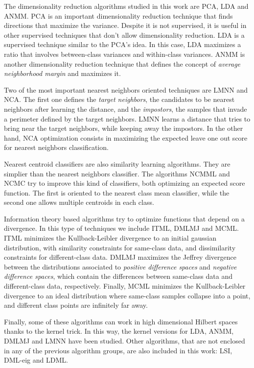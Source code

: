 The dimensionality reduction algorithms studied in this work are PCA, LDA and ANMM. PCA is an important dimensionality reduction technique that finds directions that maximize the variance. Despite it is not supervised, it is useful in other supervised techniques that don't allow dimensionality reduction. LDA is a supervised technique similar to the PCA's idea. In this case, LDA maximizes a ratio that involves between-class variances and within-class variances. ANMM is another dimensionality reduction technique that defines the concept of \emph{average neighborhood margin} and maximizes it.

Two of the most important nearest neighbors oriented techniques are LMNN and NCA. The first one defines the \emph{target neighbors}, the candidates to be nearest neighbors after learning the distance, and the \emph{impostors}, the samples that invade a perimeter defined by the target neighbors. LMNN learns a distance that tries to bring near the target neighbors, while keeping away the impostors. In the other hand, NCA optimization consists in maximizing the expected leave one out score for nearest neighbors classification.

Nearest centroid classifiers are also similarity learning algorithms. They are simplier than the nearest neighbors classifier. The algorithms NCMML and NCMC try to improve this kind of classifiers, both optimizing an expected score function. The first is oriented to the nearest class mean classifier, while the second one allows multiple centroids in each class.

Information theory based algorithms try to optimize functions that depend on a divergence. In this type of techniques we include ITML, DMLMJ and MCML. ITML minimizes the Kullback-Leibler divergence to an initial gaussian distribution, with similarity constraints for same-class data, and dissimilarity constraints for different-class data. DMLMJ maximizes the Jeffrey divergence between the distributions associated to \emph{positive difference spaces} and \emph{negative difference spaces}, which contain the differences between same-class data and different-class data, respectively. Finally, MCML minimizes the Kullback-Leibler divergence to an ideal distribution where same-class samples collapse into a point, and different class points are infinitely far away.

Finally, some of these algorithms can work in high dimensional Hilbert spaces thanks to the kernel trick. In this way, the kernel versions for LDA, ANMM, DMLMJ and LMNN have been studied. Other algorithms, that are not enclosed in any of the previous algorithm groups, are also included in this work: LSI, DML-eig and LDML.


